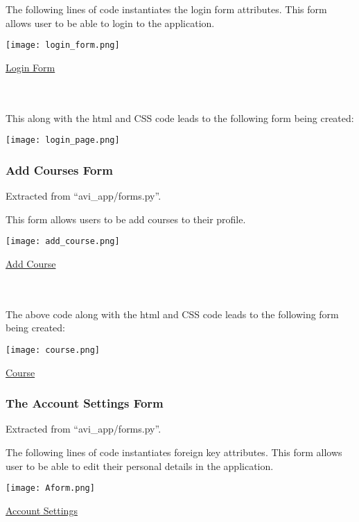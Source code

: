 \documentclass[10pt]{article}
\begin{document}
The following lines of code instantiates the login form attributes. This form allows user to be able to login to the application.

\begin{center}
\texttt{[image: login\_form.png]}
\end{center}
\caption{\underline{Login Form}} \\ \\

This along with the html and CSS code leads to the following form being created:

\begin{center}
\texttt{[image: login\_page.png]}
\end{center}


\subsubsection{Add Courses Form}
Extracted from “avi\_app/forms.py”.

This form allows users to be add courses to their profile.

\begin{center}
\texttt{[image: add\_course.png]}
\end{center}
\caption{\underline{Add Course}} \\ \\

The above code along with the html and CSS code leads to the following form being created:

\begin{center}
\texttt{[image: course.png]}
\end{center}
\caption{\underline{Course}}

\subsubsection{The  Account Settings Form}

Extracted from “avi\_app/forms.py”.

The following lines of code instantiates foreign key attributes. This form allows user to be able to edit their personal details in the application.

\begin{center}
\texttt{[image: Aform.png]}
\end{center}
\caption{\underline{Account Settings}} \\ \\
\end{document}
